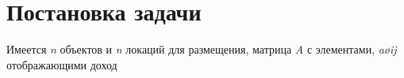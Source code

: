 \section{Постановка задачи}

\tab Имеется \textit{n} объектов и \textit{n} локаций для размещения, матрица \textit{A} с элементами, \textit{a\o{ij}} отображающими доход 
\newpage